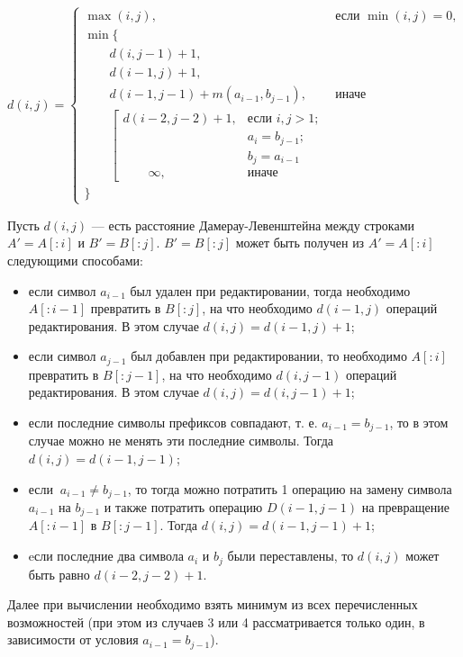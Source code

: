 \begin{equation}
	\label{eq:DL}
	d(i, j) = \begin{cases}
		\max(i, j), &\text{если }\min(i, j) = 0,\\
		\min \lbrace \\
			\qquad d(i, j-1) + 1,\\
			\qquad d(i-1, j) + 1,\\
			\qquad d(i-1, j-1) + m(a_{i-1}, b_{j-1}), &\text{иначе}\\
			\qquad \left[ \begin{array}{cc}d(i-2, j-2) + 1, &\text{если }i,j > 1;\\
			\qquad &\text{}a_{i} = b_{j-1}; \\
			\qquad &\text{}b_{j} = a_{i-1}\\
			\qquad \infty, & \text{иначе}\end{array}\right.\\
		\rbrace
		\end{cases}
\end{equation}

Пусть $d(i,j)$ --- есть расстояние Дамерау-Левенштейна между строками $A'= A[:i]$ и $B' = B[:j]$. $B' = B[:j]$ может быть получен из $A'= A[:i]$ следующими способами:

\begin{itemize}
	\item если символ $a_{i-1}$ был удален при редактировании, тогда необходимо $A[:i-1]$ превратить в $B[:j]$, на что необходимо $d(i-1,j)$ операций редактирования. В этом случае $d(i,j) = d(i-1,j) + 1$;
	\item если символ $a_{j-1}$ был добавлен при редактировании, то необходимо $A[:i]$ превратить в $B[:j-1]$, на что необходимо $d(i,j-1)$ операций редактирования. В этом случае $d(i,j) = d(i,j-1) + 1$;
	\item если последние символы префиксов совпадают, т. е. $a_{i-1} = b_{j-1}$, то в этом случае можно не менять эти последние символы. Тогда $d(i,j) = d(i-1,j-1)$;
	\item если $\medspace a_{i-1} \neq b_{j-1}$, то тогда можно потратить 1 операцию на замену символа $a_{i-1}$ на $b_{j-1}$ и также потратить  операцию $D(i-1,j-1)$ на превращение $A[:i-1]$ в $B[:j-1]$. Тогда $d(i,j) = d(i-1,j-1) + 1$;
	\item eсли последние два символа $a_{i}$ и $b_{j}$ были переставлены, то $d(i,j)$ может быть равно $d(i-2,j-2) + 1$.
\end{itemize}

Далее при вычислении  необходимо взять минимум из всех перечисленных возможностей (при этом из случаев 3 или 4 рассматривается только один, в зависимости от условия $a_{i-1} = b_{j-1}$).


